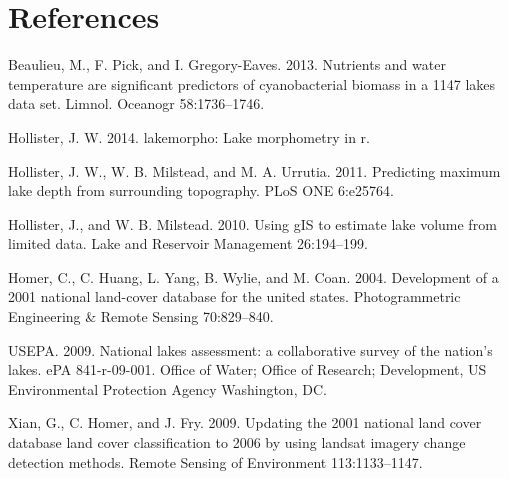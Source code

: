 \documentclass[10pt,a4paper,twocolumn]{article}
\begin{document}
\section*{References}\label{references}

Beaulieu, M., F. Pick, and I. Gregory-Eaves. 2013. Nutrients and water
temperature are significant predictors of cyanobacterial biomass in a
1147 lakes data set. Limnol. Oceanogr 58:1736--1746.

Hollister, J. W. 2014. lakemorpho: Lake morphometry in r.

Hollister, J. W., W. B. Milstead, and M. A. Urrutia. 2011. Predicting
maximum lake depth from surrounding topography. PLoS ONE 6:e25764.

Hollister, J., and W. B. Milstead. 2010. Using gIS to estimate lake
volume from limited data. Lake and Reservoir Management 26:194--199.

Homer, C., C. Huang, L. Yang, B. Wylie, and M. Coan. 2004. Development
of a 2001 national land-cover database for the united states.
Photogrammetric Engineering \& Remote Sensing 70:829--840.

USEPA. 2009. National lakes assessment: a collaborative survey of the
nation's lakes. ePA 841-r-09-001. Office of Water; Office of Research;
Development, US Environmental Protection Agency Washington, DC.

Xian, G., C. Homer, and J. Fry. 2009. Updating the 2001 national land
cover database land cover classification to 2006 by using landsat
imagery change detection methods. Remote Sensing of Environment
113:1133--1147.

\nocite{*}
{\small
}
\end{document}
